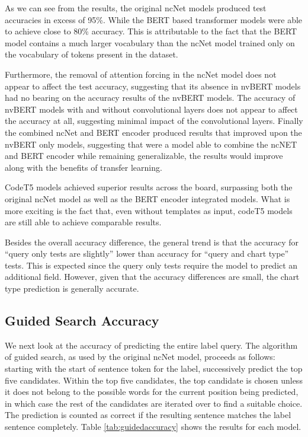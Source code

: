 \documentclass[
	a4paper, %
	10pt, %
	unnumberedsections, %
	twoside, %
]{t0003}
\begin{document}
As we can see from the results, the original ncNet models produced test accuracies in excess of 95\%. While the BERT based transformer models were able to achieve close to 80\% accuracy. This is attributable to the fact that the BERT model contains a much larger vocabulary than the ncNet model trained only on the vocabulary of tokens present in the dataset.

Furthermore, the removal of attention forcing in the ncNet model does not appear to affect the test accuracy, suggesting that its absence in nvBERT models had no bearing on the accuracy results of the nvBERT models. The accuracy of nvBERT models with and without convolutional layers does not appear to affect the accuracy at all, suggesting minimal impact of the convolutional layers.
Finally the combined ncNet and BERT encoder produced results that improved upon the nvBERT only models, suggesting that were a model able to combine the ncNET and BERT encoder while remaining generalizable, the results would improve along with the benefits of transfer learning.

CodeT5 models achieved superior results across the board, surpassing both the original ncNet model as well as the BERT encoder integrated models. What is more exciting is the fact that, even without templates as input, codeT5 models are still able to achieve comparable results.

Besides the overall accuracy difference, the general trend is that the accuracy for ``query only tests are slightly'' lower than accuracy for ``query and chart type'' tests. This is expected since the query only tests require the model to predict an additional field. However, given that the accuracy differences are small, the chart type prediction is generally accurate.

\subsection{Guided Search Accuracy}

We next look at the accuracy of predicting the entire label query. The algorithm of guided search, as used by the original ncNet model, proceeds as follows: starting with the start of sentence token for the label, successively predict the top five candidates. Within the top five candidates, the top candidate is chosen unless it does not belong to the possible words for the current position being predicted, in which case the rest of the candidates are iterated over to find a suitable choice. The prediction is counted as correct if the resulting sentence matches the label sentence completely. Table \ref{tab:guidedaccuracy} shows the results for each model.
\end{document}
